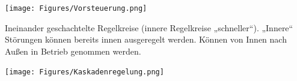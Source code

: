 \texttt{[image: Figures/Vorsteuerung.png]}


\begin{mdframed}[style=exercise, frametitle=Kaskadenregelung:]
	Ineinander geschachtelte Regelkreise (innere Regelkreise „schneller“). „Innere“
	Störungen können bereits innen ausgeregelt werden. Können von Innen nach Außen in Betrieb genommen werden.
\end{mdframed}

\texttt{[image: Figures/Kaskadenregelung.png]}

\newpage